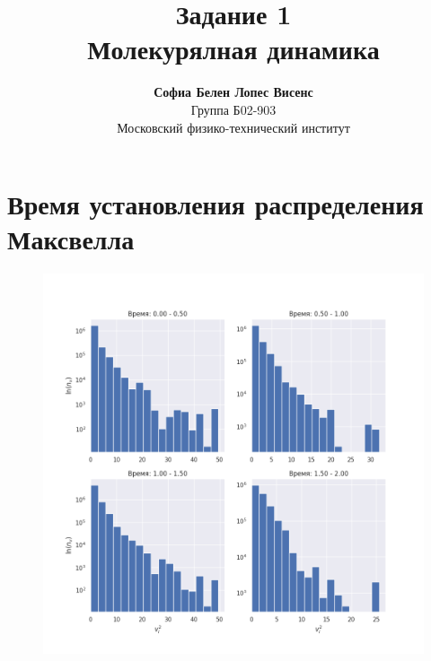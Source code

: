 \documentclass[a4paper,12pt]{article}
\author{\textbf{Софиа Белен Лопес Висенс}\\Группа Б02-903\\ \large Московский физико-технический институт}
\title{\textbf{Задание 1}\\Молекурялная динамика}
\date{}
\begin{document}
\maketitle
\newpage
\tableofcontents
\newpage

\section{Время установления распределения Максвелла}

\begin{figure}[H]
    \centering
    \includegraphics[width=\textwidth]{../../media/velocities1.png}
\end{figure}
\end{document}
